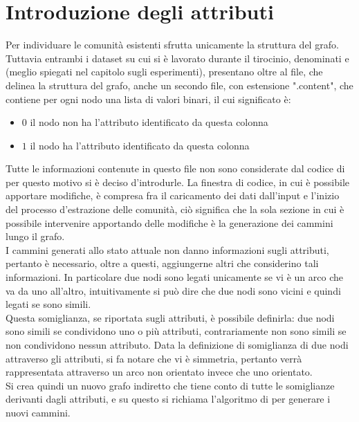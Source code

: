 \section{Introduzione degli attributi}
Per individuare le comunità esistenti \cnrl sfrutta unicamente la struttura del grafo.\\
Tuttavia entrambi i dataset su cui si è lavorato durante il tirocinio, denominati \cora e \citeseer (meglio spiegati nel capitolo sugli esperimenti), presentano oltre al file, che delinea la struttura del grafo, anche un secondo file, con estensione ".content", che contiene per ogni nodo una lista di valori binari, il cui significato è:
\begin{itemize}
	\item $0$ il nodo non ha l'attributo identificato da questa colonna
	\item $1$ il nodo ha l'attributo identificato da questa colonna
\end{itemize}
%
Tutte le informazioni contenute in questo file non sono considerate dal codice di \cnrl per questo motivo si è deciso d'introdurle. La finestra di codice, in cui è possibile apportare modifiche, è compresa fra il caricamento dei dati dall'input e l'inizio del processo d'estrazione delle comunità, ciò significa che la sola sezione in cui è possibile intervenire apportando delle modifiche è la generazione dei cammini lungo il grafo.\\
I cammini generati allo stato attuale non danno informazioni sugli attributi, pertanto è necessario, oltre a questi, aggiungerne altri che considerino tali informazioni. In particolare due nodi sono legati unicamente se vi è un arco che va da uno all'altro, intuitivamente si può dire che due nodi sono vicini e quindi legati se sono simili.\\
Questa somiglianza, se riportata sugli attributi, è possibile definirla: due nodi sono simili se condividono uno o più attributi, contrariamente non sono simili se non condividono nessun attributo. Data la definizione di somiglianza di due nodi attraverso gli attributi, si fa notare che vi è simmetria, pertanto verrà rappresentata attraverso un arco non orientato invece che uno orientato.\\
Si crea quindi un nuovo grafo indiretto che tiene conto di tutte le somiglianze derivanti dagli attributi, e su questo si richiama l'algoritmo di \nv per generare i nuovi cammini.
%
